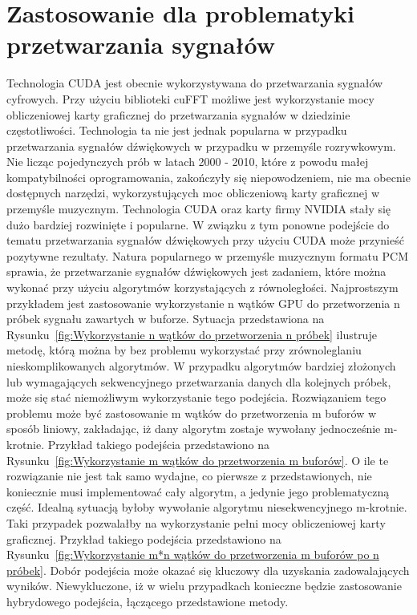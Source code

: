 \section{Zastosowanie dla problematyki przetwarzania sygnałów}
Technologia CUDA jest obecnie wykorzystywana do przetwarzania sygnałów cyfrowych. Przy użyciu biblioteki cuFFT możliwe jest wykorzystanie mocy obliczeniowej karty graficznej do przetwarzania sygnałów w dziedzinie częstotliwości. Technologia ta nie jest jednak popularna w przypadku przetwarzania sygnałów dźwiękowych w przypadku w przemyśle rozrywkowym. Nie licząc pojedynczych prób w latach 2000 - 2010, które z powodu małej kompatybilności oprogramowania, zakończyły się niepowodzeniem, nie ma obecnie dostępnych narzędzi, wykorzystujących moc obliczeniową karty graficznej w przemyśle muzycznym. Technologia CUDA oraz karty firmy NVIDIA stały się dużo bardziej rozwinięte i popularne. W związku z tym ponowne podejście do tematu przetwarzania sygnałów dźwiękowych przy użyciu CUDA może przynieść pozytywne rezultaty. Natura popularnego w przemyśle muzycznym formatu PCM sprawia, że przetwarzanie sygnałów dźwiękowych jest zadaniem, które można wykonać przy użyciu algorytmów korzystających z równoległości. Najprostszym przykładem jest zastosowanie wykorzystanie n wątków GPU do przetworzenia n próbek sygnału zawartych w buforze. Sytuacja przedstawiona na Rysunku~\ref{fig:Wykorzystanie n wątków do przetworzenia n próbek} ilustruje metodę, którą można by bez problemu wykorzystać przy zrównoleglaniu nieskomplikowanych algorytmów. W przypadku algorytmów bardziej złożonych lub wymagających sekwencyjnego przetwarzania danych dla kolejnych próbek, może się stać niemożliwym wykorzystanie tego podejścia. Rozwiązaniem tego problemu może być zastosowanie m wątków do przetworzenia m buforów w sposób liniowy, zakładając, iż dany algorytm zostaje wywołany jednocześnie m-krotnie. Przykład takiego podejścia przedstawiono na Rysunku~\ref{fig:Wykorzystanie m wątków do przetworzenia m buforów}. O ile te rozwiązanie nie jest tak samo wydajne, co pierwsze z przedstawionych, nie koniecznie musi implementować cały algorytm, a jedynie jego problematyczną część. Idealną sytuacją byłoby wywołanie algorytmu niesekwencyjnego m-krotnie. Taki przypadek pozwalałby na wykorzystanie pełni mocy obliczeniowej karty graficznej. Przykład takiego podejścia przedstawiono na Rysunku~\ref{fig:Wykorzystanie m*n wątków do przetworzenia m buforów po n próbek}. Dobór podejścia może okazać się kluczowy dla uzyskania zadowalających wyników. Niewykluczone, iż w wielu przypadkach konieczne będzie zastosowanie hybrydowego podejścia, łączącego przedstawione metody.

